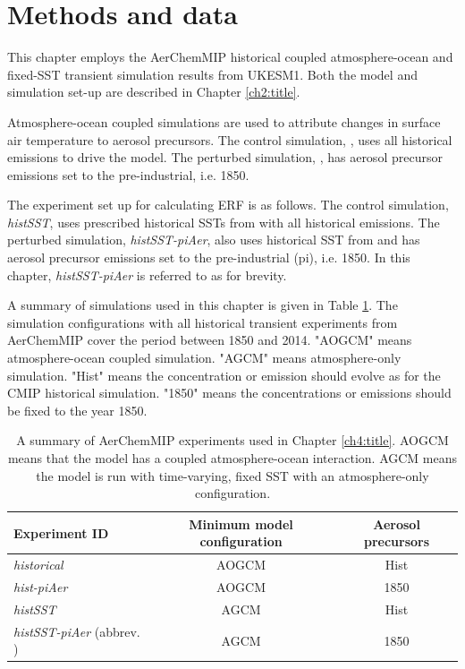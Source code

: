 \section{Methods and data}

This chapter employs the AerChemMIP historical coupled atmosphere-ocean and fixed-SST transient simulation results from UKESM1. Both the model and simulation set-up are described in Chapter \ref{ch2:title}.

Atmosphere-ocean coupled simulations are used to attribute changes in surface air temperature to aerosol precursors. The control simulation, \hist{}, uses all historical emissions to drive the model. The perturbed simulation, \histpiaer{}, has aerosol precursor emissions set to the pre-industrial, i.e. 1850.

The experiment set up for calculating ERF is as follows. The control simulation, \textit{histSST}, uses prescribed historical SSTs from \hist{} with all historical emissions. The perturbed simulation, \textit{histSST-piAer}, also uses historical SST from \hist{} and has aerosol precursor emissions set to the pre-industrial (pi), i.e. 1850. In this chapter, \textit{histSST-piAer} is referred to as \sstpiaer{} for brevity.

A summary of simulations used in this chapter is given in Table \ref{ch4:tab:simulation}. The simulation configurations with all historical transient experiments from AerChemMIP cover the period between 1850 and 2014. "AOGCM" means atmosphere-ocean coupled simulation. "AGCM" means atmosphere-only simulation. "Hist" means the concentration or emission should evolve as for the CMIP historical simulation. "1850" means the concentrations or emissions should be fixed to the year 1850.

\begin{table}[!ht]
   \caption[AerChemMIP simulations used in Chapter \ref{ch4:title}]{A summary of AerChemMIP experiments used in Chapter \ref{ch4:title}. AOGCM means that the model has a coupled atmosphere-ocean interaction. AGCM means the model is run with time-varying, fixed SST with an atmosphere-only configuration.}
   \label{ch4:tab:simulation}
   \centering
   \begin{tabular}{l c c}
    \toprule
     Experiment ID & Minimum model configuration & Aerosol precursors\\
    \midrule
     \textit{historical}      & AOGCM & Hist\\
     \textit{hist-piAer}      & AOGCM & 1850\\
     \textit{histSST}         & AGCM & Hist\\
     \textit{histSST-piAer} (abbrev. \sstpiaer{})  & AGCM & 1850\\
     \bottomrule
   \end{tabular}
\end{table}


